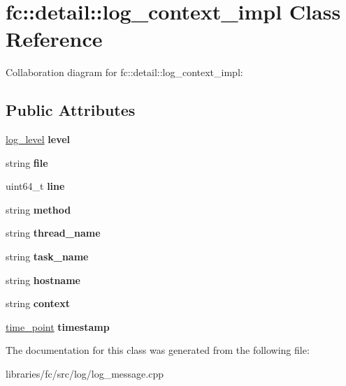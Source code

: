\hypertarget{classfc_1_1detail_1_1log__context__impl}{}\section{fc\+:\+:detail\+:\+:log\+\_\+context\+\_\+impl Class Reference}
\label{classfc_1_1detail_1_1log__context__impl}


Collaboration diagram for fc\+:\+:detail\+:\+:log\+\_\+context\+\_\+impl\+:
\subsection*{Public Attributes}
\begin{DoxyCompactItemize}
\item 
\mbox{\label{classfc_1_1detail_1_1log__context__impl_a23a661d71fa37497ac1e4517cd04b082}} 
\mbox{\hyperlink{classfc_1_1log__level}{log\+\_\+level}} {\bfseries level}
\item 
\mbox{\label{classfc_1_1detail_1_1log__context__impl_a2f670d8155dcbc65950d7bf16726f78c}} 
string {\bfseries file}
\item 
\mbox{\label{classfc_1_1detail_1_1log__context__impl_a511e41014c95a1ea35be989559ceb7c7}} 
uint64\+\_\+t {\bfseries line}
\item 
\mbox{\label{classfc_1_1detail_1_1log__context__impl_aaeaa49cbfbade497752f917d01be0883}} 
string {\bfseries method}
\item 
\mbox{\label{classfc_1_1detail_1_1log__context__impl_a785b3d3e3ba57c53a5557e5db3f5b451}} 
string {\bfseries thread\+\_\+name}
\item 
\mbox{\label{classfc_1_1detail_1_1log__context__impl_a2161154ae00c2a59614a55bd116dab77}} 
string {\bfseries task\+\_\+name}
\item 
\mbox{\label{classfc_1_1detail_1_1log__context__impl_a5f33fb7c64da9bff3df2580268cfc561}} 
string {\bfseries hostname}
\item 
\mbox{\label{classfc_1_1detail_1_1log__context__impl_a57787e0ab473e6aa785081f401990637}} 
string {\bfseries context}
\item 
\mbox{\label{classfc_1_1detail_1_1log__context__impl_a0905f6848b7ccef390aed076e15e67fb}} 
\mbox{\hyperlink{classfc_1_1time__point}{time\+\_\+point}} {\bfseries timestamp}
\end{DoxyCompactItemize}


The documentation for this class was generated from the following file\+:\begin{DoxyCompactItemize}
\item 
libraries/fc/src/log/log\+\_\+message.\+cpp\end{DoxyCompactItemize}
